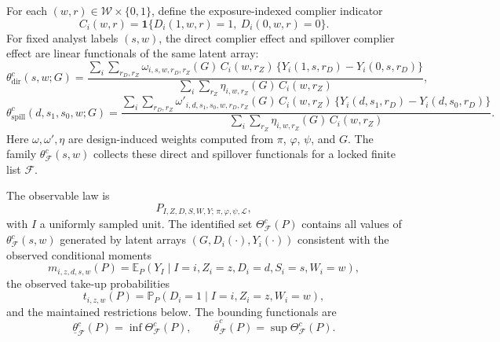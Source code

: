 \documentclass[11pt]{article}
\newcommand{\E}{\mathbb{E}}
\renewcommand{\Pr}{\mathbb{P}}
\newcommand{\one}{\mathbf{1}}
\theoremstyle{definition}
\theoremstyle{plain}
\theoremstyle{remark}
\begin{document}
For each \((w,r)\in\mathcal W\times\{0,1\}\), define the exposure-indexed complier indicator
\[
C_i(w,r)=\one\{D_i(1,w,r)=1,\ D_i(0,w,r)=0\}.
\]
For fixed analyst labels \((s,w)\), the direct complier effect and spillover complier effect are linear functionals of the same latent array:
\[
\theta_{\mathrm{dir}}^{c}(s,w;G)
=
\frac{\sum_i \sum_{r_D,r_Z} \omega_{i,s,w,r_D,r_Z}(G)\,C_i(w,r_Z)\,
\{Y_i(1,s,r_D)-Y_i(0,s,r_D)\}}
{\sum_i \sum_{r_Z} \eta_{i,w,r_Z}(G)\,C_i(w,r_Z)},
\]
\[
\theta_{\mathrm{spill}}^{c}(d,s_1,s_0,w;G)
=
\frac{\sum_i \sum_{r_D,r_Z} \omega'_{i,d,s_1,s_0,w,r_D,r_Z}(G)\,C_i(w,r_Z)\,
\{Y_i(d,s_1,r_D)-Y_i(d,s_0,r_D)\}}
{\sum_i \sum_{r_Z} \eta_{i,w,r_Z}(G)\,C_i(w,r_Z)}.
\]
Here \(\omega,\omega',\eta\) are design-induced weights computed from \(\pi\), \(\varphi\), \(\psi\), and \(G\). The family \(\theta^{c}_{\mathcal F}(s,w)\) collects these direct and spillover functionals for a locked finite list \(\mathcal F\).

The observable law is
\[
P_{I,Z,D,S,W,Y;\,\pi,\varphi,\psi,\mathcal L},
\]
with \(I\) a uniformly sampled unit. The identified set \(\Theta^{c}_{\mathcal F}(P)\) contains all values of \(\theta^{c}_{\mathcal F}(s,w)\) generated by latent arrays \((G,D_i(\cdot),Y_i(\cdot))\) consistent with the observed conditional moments
\[
m_{i,z,d,s,w}(P)=\E_P(Y_I\mid I=i,Z_i=z,D_i=d,S_i=s,W_i=w),
\]
the observed take-up probabilities
\[
t_{i,z,w}(P)=\Pr_P(D_i=1\mid I=i,Z_i=z,W_i=w),
\]
and the maintained restrictions below. The bounding functionals are
\[
\underline\theta^{c}_{\mathcal F}(P)=\inf \Theta^{c}_{\mathcal F}(P),
\qquad
\overline\theta^{c}_{\mathcal F}(P)=\sup \Theta^{c}_{\mathcal F}(P).
\]
\end{document}
